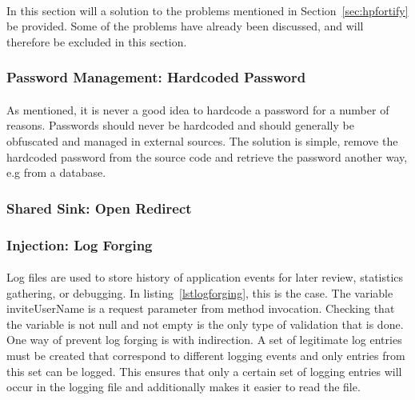 \documentclass[11pt,english,a4paper]{report}
\begin{document}
\paragraph{}
In this section will a solution to the problems mentioned in Section~\ref{sec:hpfortify} be provided.
Some of the problems have already been discussed, and will therefore be excluded in this section. 

\subsubsection{Password Management: Hardcoded Password}
\label{passwordmanagement}
\paragraph{}
As mentioned, it is never a good idea to hardcode a password for a number of reasons.
Passwords should never be hardcoded and should generally be obfuscated and managed in external sources. 
The solution is simple, remove the hardcoded password from the source code and retrieve the password another way, e.g from a database.

\subsubsection{Shared Sink: Open Redirect}
\paragraph{}


\subsubsection{Injection: Log Forging}
\paragraph{}
Log files are used to store history of application events for later review, statistics gathering, or debugging.
In listing~\ref{lstlogforging}, this is the case.
The variable inviteUserName is a request parameter from method invocation. 
Checking that the variable is not null and not empty is the only type of validation that is done. 
One way of prevent log forging is with indirection.
A set of legitimate log entries must be created that correspond to different logging events and only entries from this set can be logged.
This ensures that only a certain set of logging entries will occur in the logging file and additionally makes it easier to read the file.
\end{document}
